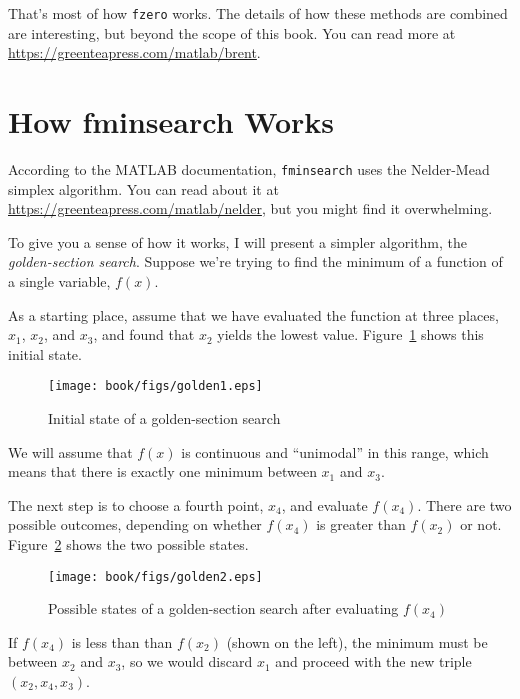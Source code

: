 That's most of how \lstinline{fzero} works.  The details of how these methods are combined are interesting, but beyond the scope of this book.  You can read more at \url{https://greenteapress.com/matlab/brent}.


\section{How fminsearch Works}
\label{howfminsearch}

According to the MATLAB documentation, \lstinline{fminsearch} uses the Nelder-Mead simplex algorithm.  You can read about it at \url{https://greenteapress.com/matlab/nelder}, but you might find it overwhelming.


To give you a sense of how it works, I will present a simpler algorithm, the \emph{golden-section search}.  Suppose we're trying to find the minimum of a function of a single variable, $f(x)$.

As a starting place, assume that we have evaluated the function at three places,
$x_1$, $x_2$, and $x_3$, and found that $x_2$ yields the lowest
value. Figure~\ref{fig:golden1} shows this initial state.

\begin{figure}[ht]
\centerline{\texttt{[image: book/figs/golden1.eps]}}
\caption{Initial state of a golden-section search}
\label{fig:golden1}
\end{figure}

We will assume that $f(x)$ is continuous and ``unimodal'' in this range, which means that there is exactly one minimum between $x_1$ and $x_3$.


The next step is to choose a fourth point, $x_4$, and evaluate
$f(x_4)$.  There are two possible outcomes, depending on whether
$f(x_4)$ is greater than $f(x_2)$ or not.
Figure~\ref{fig:golden2} shows the two possible states.

\begin{figure}[ht]
\centerline{\texttt{[image: book/figs/golden2.eps]}}
\caption{Possible states of a golden-section search after evaluating $f(x_4)$}
\label{fig:golden2}
\end{figure}

If $f(x_4)$ is less than than $f(x_2)$ (shown on the left), the
minimum must be between $x_2$ and $x_3$, so we would discard $x_1$ and proceed with the new triple $(x_2, x_4, x_3)$.

